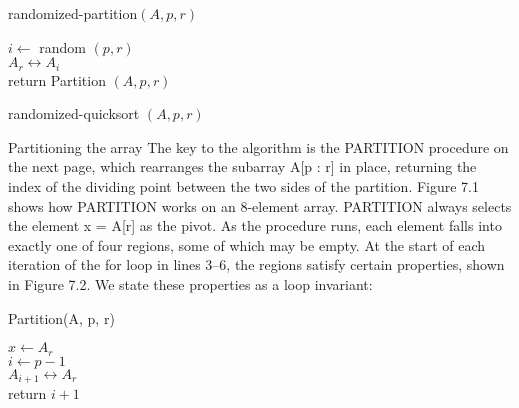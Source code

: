 \begin{algbox}{randomized-partition$(A, p, r)$}
  \begin{algorithm}[H]
      $i \leftarrow $ random $(p, r)$ \\
      $A_{r} \leftrightarrow A_{i} $ \\
      return Partition $(A, p, r)$
    \end{algorithm}
\end{algbox}


    \begin{algbox}{randomized-quicksort $(A, p, r)$}
      \begin{algorithm}[H]
      \end{algorithm}
    \end{algbox}

Partitioning the array
The key to the algorithm is the PARTITION procedure on the next page, which rearranges the subarray A[p : r] in place, returning the index of the dividing point between the two sides of the partition.
Figure 7.1 shows how PARTITION works on an 8-element array. PARTITION always selects the element x = A[r] as the pivot. As the procedure runs, each element falls into exactly one of four regions, some of which may be empty. At the start of each iteration of the for loop in lines 3–6, the regions satisfy certain properties, shown in Figure 7.2. We state these properties as a loop invariant:


\begin{algbox}{Partition(A, p, r)}
  \begin{algorithm}[H]
    $ x \leftarrow A_{r} $ \\
    $ i \leftarrow p - 1 $ \\
   $ A_{i+1} \leftrightarrow A_{r} $\\
   return $ i+1$
  \end{algorithm}
\end{algbox}


